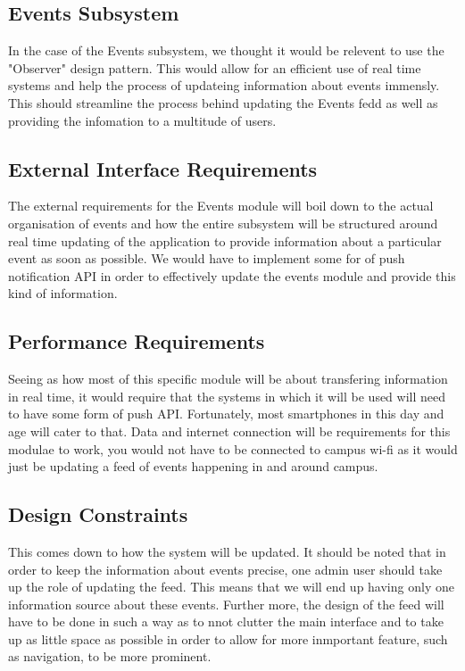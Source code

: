 \documentclass{article}
\begin{document}
		\subsection{Events Subsystem}
				In the case of the Events subsystem, we thought it would be relevent to use the "Observer" design pattern. This would allow for an efficient use of real time systems and help the process of updateing information about events immensly. This should streamline the process behind updating the Events fedd as well as providing the infomation to a multitude of users. 
				
			\subsection{External Interface Requirements}
					The external requirements for the Events module will boil down to the actual organisation of events and how the entire subsystem will be structured around real time updating of the application to provide information about a particular event as soon as possible. We would have to implement some for of push notification API in order to effectively update the events module and provide this kind of information.

			\subsection{Performance Requirements}
					Seeing as how most of this specific module will be about transfering information in real time, it would require that the systems in which it will be used will need to have some form of push API. Fortunately, most smartphones in this day and age will cater to that. Data and internet connection will be requirements for this modulae to work, you would not have to be connected to campus wi-fi as it would just be updating a feed of events happening in and around campus.
		
			\subsection{Design Constraints}
					This comes down to how the system will be updated. It should be noted that in order to keep the information about events precise, one admin user should take up the role of updating the feed. This means that we will end up having only one information source about these events. Further more, the design of the feed will have to be done in such a way as to nnot clutter the main interface and to take up as little space as possible in order to allow for more inmportant feature, such as navigation, to be more prominent.
\end{document}
